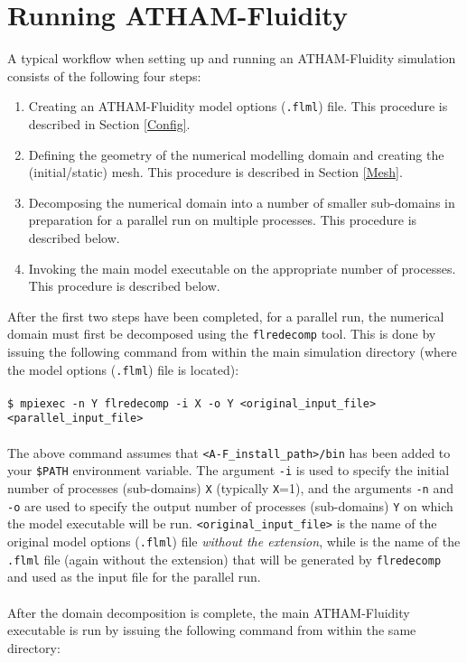 \documentclass[10pt,a4paper]{article}
\newcommand\tab[1][0.5cm]{\hspace*{#1}}
\begin{document}
\section{Running ATHAM-Fluidity}
A typical workflow when setting up and running an ATHAM-Fluidity simulation consists of the following four steps:
\begin{enumerate}
\item Creating an ATHAM-Fluidity model options (\texttt{.flml}) file. This procedure is described in Section \ref{Config}.
\item Defining the geometry of the numerical modelling domain and creating the (initial/static) mesh. This procedure is described in Section \ref{Mesh}.
\item Decomposing the numerical domain into a number of smaller sub-domains in preparation for a parallel run on multiple processes. This procedure is described below.
\item Invoking the main model executable on the appropriate number of processes. This procedure is described below.
\end{enumerate}
After the first two steps have been completed, for a parallel run, the numerical domain must first be decomposed using the \texttt{flredecomp} tool. This is done by issuing the following command from within the main simulation directory (where the model options (\texttt{.flml}) file is located):\\\\
\tab \texttt{\$ mpiexec -n Y flredecomp -i X -o Y <original\_input\_file> <parallel\_input\_file>}\\\\
The above command assumes that \texttt{<A-F\_install\_path>/bin} has been added to your \texttt{\$PATH} environment variable. The argument \texttt{-i} is used to specify the initial number of processes (sub-domains) \texttt{X} (typically \texttt{X}=1), and the arguments \texttt{-n} and \texttt{-o} are used to specify the output number of processes (sub-domains) \texttt{Y} on which the model executable will be run. \texttt{<original\_input\_file>} is the name of the original model options (\texttt{.flml}) file \textit{without the extension}, while \texttt{} is the name of the \texttt{.flml} file (again without the extension) that will be generated by \texttt{flredecomp} and used as the input file for the parallel run.\\\\
After the domain decomposition is complete, the main ATHAM-Fluidity executable is run by issuing the following command from within the same directory:\\\\
\end{document}

